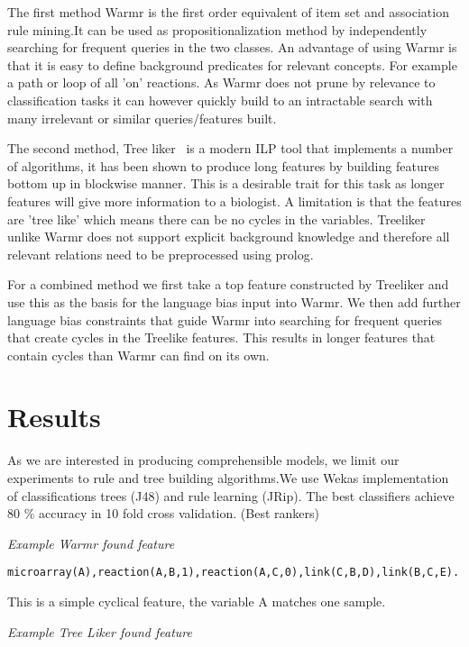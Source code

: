 \documentclass[runningheads,a4paper]{llncs}
\begin{document}
The first method Warmr \citep{dehaspe_mining_1997} is the first order equivalent of item set and association rule mining.It can be used as propositionalization method by independently searching for frequent queries in the two classes. An advantage of using Warmr is that it is easy to define background predicates for relevant concepts. For example a path or loop of all 'on' reactions. As Warmr does not prune by relevance to classification tasks it can however quickly build to an intractable search with many irrelevant or similar queries/features built. 
	     

The second method, Tree liker~\citep{vzelezny2013fast} is a modern ILP tool that implements a number of algorithms, it has been shown to produce long features by building features bottom up in blockwise manner. This is a desirable trait for  this task as longer features will give more information to a biologist. A limitation is that the features are 'tree like' which means there can be no cycles in the variables. Treeliker unlike Warmr does not support explicit background knowledge and therefore all relevant relations need to be preprocessed using prolog.

For a combined method we first take a top feature constructed by Treeliker and use this as the basis for the language bias input into Warmr. We then add further language bias constraints that guide Warmr into searching for frequent queries that create cycles in the Treelike features. This results in longer features that contain cycles than Warmr can find on its own. 
	     
	     
\section{Results}
As we are interested in producing comprehensible models, we limit our experiments to rule and tree building algorithms.We use Wekas implementation of classifications trees (J48) and rule learning (JRip). The best classifiers achieve 80 \% accuracy in 10 fold cross validation.
(Best rankers)
\newline

\noindent
{\it{Example Warmr found feature}}
\begin{verbatim}
microarray(A),reaction(A,B,1),reaction(A,C,0),link(C,B,D),link(B,C,E).
\end{verbatim}
\noindent 
This is a simple cyclical feature, the variable A matches one sample. 
\newline

\noindent
{\it{Example Tree Liker found feature}}
\end{document}
